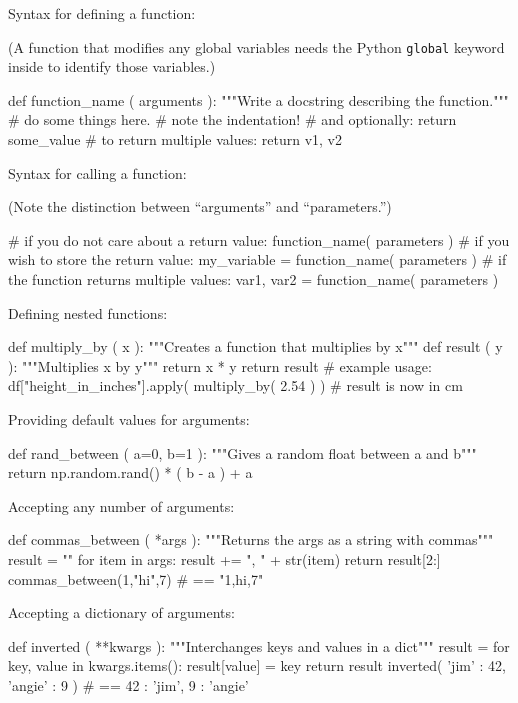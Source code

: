 \documentclass[a4paper,landscape,columns=3]{cheatsheet}
\begin{document}
Syntax for defining a function:

(A function that modifies any global variables needs the Python \lstinline{global} keyword inside to identify those variables.)
\begin{python}
def function_name ( arguments ):
    """Write a docstring describing the function."""
    # do some things here.
    # note the indentation!
    # and optionally:
    return some_value
    # to return multiple values: return v1, v2
\end{python}

Syntax for calling a function:

(Note the distinction between ``arguments''  and ``parameters.'')
\begin{python}
# if you do not care about a return value:
function_name( parameters )
# if you wish to store the return value:
my_variable = function_name( parameters )
# if the function returns multiple values:
var1, var2 = function_name( parameters )
\end{python}

Defining nested functions:
\begin{python}
def multiply_by ( x ):
    """Creates a function that multiplies by x"""
    def result ( y ):
        """Multiplies x by y"""
        return x * y
    return result
# example usage:
df["height_in_inches"].apply(
    multiply_by( 2.54 ) )  # result is now in cm
\end{python}

Providing default values for arguments:
\begin{python}
def rand_between ( a=0, b=1 ):
    """Gives a random float between a and b"""
    return np.random.rand() * ( b - a ) + a
\end{python}

Accepting any number of arguments:
\begin{python}
def commas_between ( *args ):
    """Returns the args as a string with commas"""
    result = ""
    for item in args:
        result += ", " + str(item)
    return result[2:]
commas_between(1,"hi",7)    # == "1,hi,7"
\end{python}

Accepting a dictionary of arguments:
\begin{python}
def inverted ( **kwargs ):
    """Interchanges keys and values in a dict"""
    result = {}
    for key, value in kwargs.items():
        result[value] = key
    return result
inverted( { 'jim' : 42, 'angie' : 9 } )
        # == { 42 : 'jim', 9 : 'angie' }
\end{python}
\end{document}
